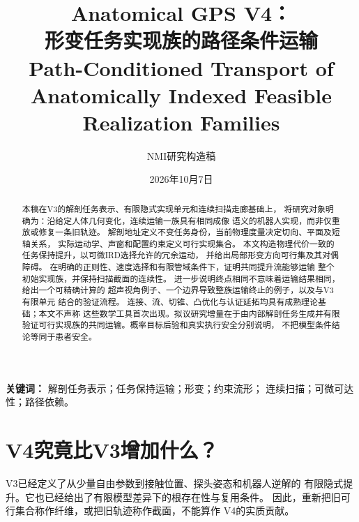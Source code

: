 \documentclass[UTF8,11pt,a4paper,fontset=fandol]{ctexart}
\numberwithin{equation}{section}
\theoremstyle{definition}
\begin{document}
\title{
Anatomical GPS V4：\\
形变任务实现族的路径条件运输\\[2mm]
\large Path-Conditioned Transport of Anatomically Indexed
Feasible Realization Families
}
\author{NMI研究构造稿}
\date{2026年10月7日}
\maketitle

\begin{abstract}
本稿在V3的解剖任务表示、有限隐式实现单元和连续扫描走廊基础上，
将研究对象明确为：沿给定人体几何变化，连续运输一族具有相同成像
语义的机器人实现，而非仅重放或修复一条旧轨迹。
解剖地址定义不变任务身份，当前物理度量决定切向、平面及短轴关系，
实际运动学、声窗和配置约束定义可行实现集合。
本文构造物理代价一致的任务保持提升，以可微IRD选择允许的冗余运动，
并给出局部形变方向可行集及其对偶障碍。
在明确的正则性、速度选择和有限管域条件下，证明共同提升流能够运输
整个初始实现族，并保持扫描截面的连续性。
进一步说明终点相同不意味着运输结果相同，给出一个可精确计算的
超声视角例子、一个边界导致整族运输终止的例子，以及与V3有限单元
结合的验证流程。
连接、流、切锥、凸优化与认证延拓均具有成熟理论基础；本文不声称
这些数学工具首次出现。拟议研究增量在于由内部解剖任务生成并有限
验证可行实现族的共同运输。概率目标后验和真实执行安全分别说明，
不把模型条件结论等同于患者安全。
\end{abstract}

\noindent\textbf{关键词：}
解剖任务表示；任务保持运输；形变；约束流形；
连续扫描；可微可达性；路径依赖。

\begin{center}
\end{center}

\clearpage
\setcounter{tocdepth}{1}
\tableofcontents
\clearpage

\section{V4究竟比V3增加什么？}

V3已经定义了从少量自由参数到接触位置、探头姿态和机器人逆解的
有限隐式提升。它也已经给出了有限模型差异下的根存在性与复用条件。
因此，重新把旧可行集合称作纤维，或把旧轨迹称作截面，不能算作
V4的实质贡献。
\end{document}
